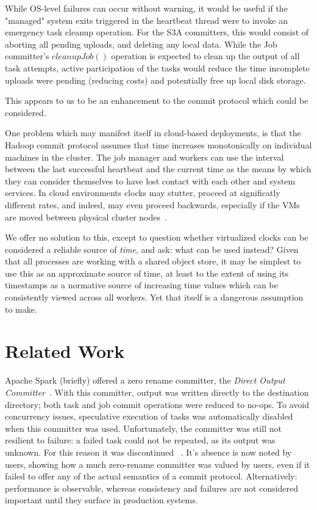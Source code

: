 \documentclass[9pt,technote]{IEEEtran}
\begin{document}
While OS-level failures can occur without warning, it would be useful if the
"managed" system exits triggered in the heartbeat thread were to invoke
an emergency task cleanup operation.
For the S3A committers, this would consist of aborting all pending uploads, and
deleting any local data.
While the Job committer's $cleanupJob()$ operation is expected to clean up
the output of all task attempts, active participation of the tasks would
reduce the time incomplete uploads were pending (reducing costs) and
potentially free up local disk storage.

This appears to us to be an enhancement to the commit protocol which could
be considered.


One problem which may manifest itself in cloud-based deployments,
is that the Hadoop commit protocol assumes that time increases monotonically
on individual machines in the cluster.
The job manager and workers can use the interval between the last successful heartbeat
and the current time as the means by which they can consider themselves to have lost
contact with each other and system services.
In cloud environments clocks may stutter, proceed at significatly different rates,
and indeed, may even proceed backwards, especially if the VMs are moved between
physical cluster nodes\ \cite{anything?}.

We offer no solution to this, except to question whether virtualized clocks can
be considered a reliable source of \emph{time}, and ask: what can be used instead?
Given that all processes are working with a shared object store, it may be simplest
to use this as an approximate source of time, at least to the extent of using
its timestamps as a normative source of increasing time values which can be
consistently viewed across all workers.
Yet that itself is a dangerous assumption to make.



\section{Related Work}
\label{sec:relatedWork}

Apache Spark (briefly) offered a zero rename committer,
the \emph{Direct Output Committer}\ \cite{JIRA}.
With this committer, output was written directly to the destination directory;
both task and job commit operations were reduced to no-ops.
To avoid concurrency issues, speculative execution of tasks was automatically
disabled when this committer was used.
Unfortunately, the committer was still not resilient to failure: a failed
task could not be repeated, as its output was unknown.
For this reason it was discontinued \ \cite{DOC-JIRA}.
It's absence is now noted by users, showing how a much zero-rename committer
was valued by users, even if it failed to offer any of the actual semantics
of a commit protocol.
Alternatively: performance is observable, whereas consistency and failures
are not considered important until they surface in production systems.
\end{document}
